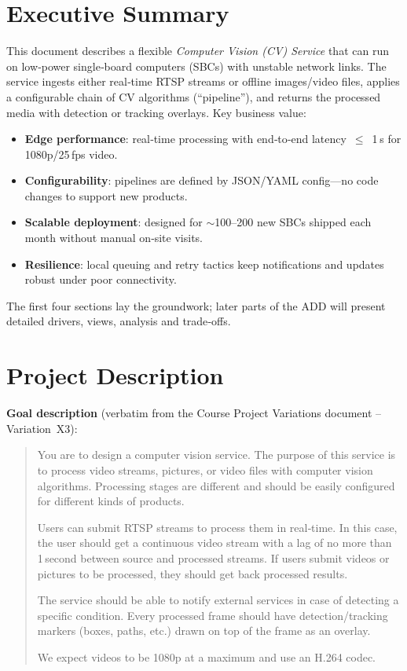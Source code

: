 \documentclass[11pt,a4paper]{article}
\begin{document}
\section{Executive Summary}
This document describes a flexible \textit{Computer Vision (CV) Service} that can run on low‑power single‑board computers (SBCs) with unstable network links.  
The service ingests either real‑time RTSP streams or offline images/video files, applies a configurable chain of CV algorithms (``pipeline''), and returns the processed media with detection or tracking overlays.  
Key business value:

\begin{itemize}
  \item \textbf{Edge performance}: real‑time processing with end‑to‑end latency $\le$ 1 s for 1080p/25 fps video.
  \item \textbf{Configurability}: pipelines are defined by JSON/YAML config—no code changes to support new products.
  \item \textbf{Scalable deployment}: designed for \(\sim\)100–200 new SBCs shipped each month without manual on‑site visits.
  \item \textbf{Resilience}: local queuing and retry tactics keep notifications and updates robust under poor connectivity.
\end{itemize}

The first four sections lay the groundwork; later parts of the ADD will present detailed drivers, views, analysis and trade‑offs.

\section{Project Description}
\textbf{Goal description} (verbatim from the Course Project Variations document – Variation X3):

\begin{quote}
You are to design a computer vision service. The purpose of this service is to process video streams, pictures, or video files with computer vision algorithms. Processing stages are different and should be easily configured for different kinds of products.

Users can submit RTSP streams to process them in real‑time. In this case, the user should get a continuous video stream with a lag of no more than 1 second between source and processed streams. If users submit videos or pictures to be processed, they should get back processed results.

The service should be able to notify external services in case of detecting a specific condition. Every processed frame should have detection/tracking markers (boxes, paths, etc.) drawn on top of the frame as an overlay.

We expect videos to be 1080p at a maximum and use an H.264 codec.
\end{quote}
\end{document}
